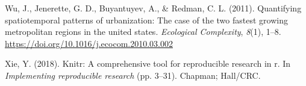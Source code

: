 \documentclass[
]{article}
\newlength{\cslhangindent}
\newenvironment{CSLReferences}[2] %
 {\begin{list}{}{%
  \setlength{\itemindent}{0pt}
  \setlength{\leftmargin}{0pt}
  \setlength{\parsep}{0pt}
  \ifodd #1
   \setlength{\leftmargin}{\cslhangindent}
   \setlength{\itemindent}{-1\cslhangindent}
  \fi
  \setlength{\itemsep}{#2\baselineskip}}}
 {\end{list}}
\begin{document}
\begin{CSLReferences}{1}{0}
Wu, J., Jenerette, G. D., Buyantuyev, A., \& Redman, C. L. (2011).
Quantifying spatiotemporal patterns of urbanization: The case of the two
fastest growing metropolitan regions in the united states.
\emph{Ecological Complexity}, \emph{8}(1), 1--8.
\url{https://doi.org/10.1016/j.ecocom.2010.03.002}

Xie, Y. (2018). Knitr: A comprehensive tool for reproducible research in
r. In \emph{Implementing reproducible research} (pp. 3--31). Chapman;
Hall/CRC.

\end{CSLReferences}
\end{document}
